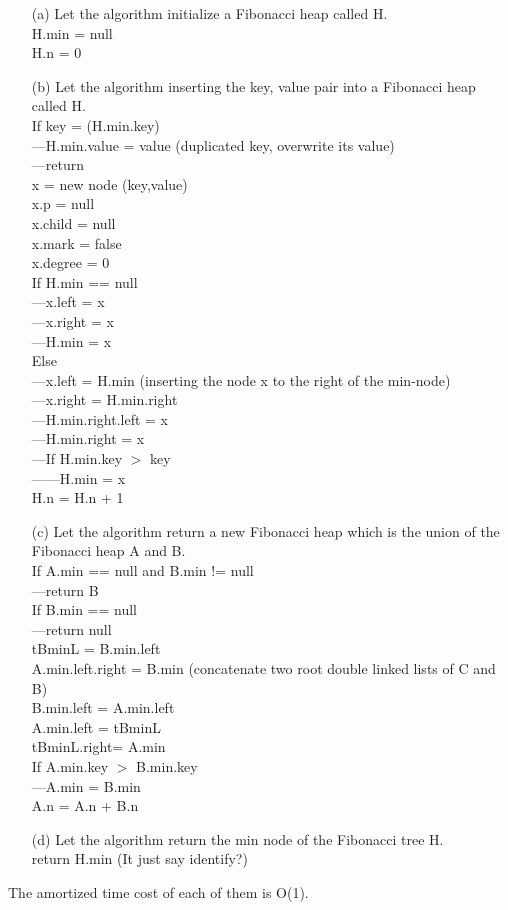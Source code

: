 \documentclass[10pt,twoside,a4paper]{article}
\begin{document}
\begin{itemize}
\item[(a)]
Let the algorithm initialize a Fibonacci heap called H.
\\H.min = null
\\H.n = 0
\item[(b)]
Let the algorithm inserting the key, value pair into a Fibonacci heap called H.
\\If key = (H.min.key)
\\---H.min.value = value (duplicated key, overwrite its value)
\\---return
\\x = new node (key,value)
\\x.p = null
\\x.child = null
\\x.mark = false
\\x.degree = 0
\\If H.min == null
\\---x.left = x
\\---x.right = x
\\---H.min = x
\\Else
\\---x.left = H.min (inserting the node x to the right of the min-node)
\\---x.right = H.min.right 
\\---H.min.right.left = x
\\---H.min.right = x
\\---If H.min.key $>$ key
\\------H.min = x
\\H.n = H.n + 1 
\item[(c)]
Let the algorithm return a new Fibonacci heap which is the union of the Fibonacci heap A and B.
\\If A.min == null and B.min != null
\\---return B
\\If B.min == null
\\---return null
\\tBminL = B.min.left
\\A.min.left.right = B.min (concatenate two root double linked lists of C and B)
\\B.min.left = A.min.left
\\A.min.left = tBminL
\\tBminL.right= A.min
\\If A.min.key $>$ B.min.key
\\---A.min = B.min
\\A.n = A.n + B.n
\item[(d)]
Let the algorithm return the min node of the Fibonacci tree H.
\\return H.min (It just say identify?)
\end{itemize}
The amortized time cost of each of them is O(1).
\end{document}
